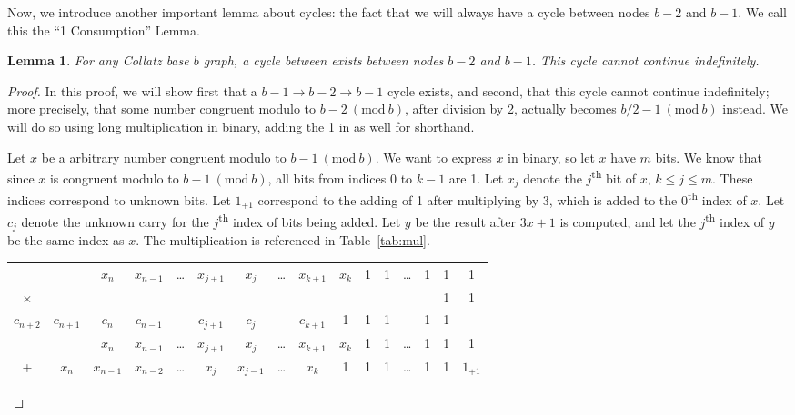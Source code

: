 \documentclass[12pt]{article}
\newcommand{\Mod}[1]{\ (\mathrm{mod}\ #1)}
\newtheorem{lemma}[theorem]{Lemma}
\theoremstyle{definition}
\begin{document}
Now, we introduce another important lemma about cycles: the fact that we will always have a cycle between nodes $b-2$ and $b-1$. We call this the ``1 Consumption'' Lemma.
\begin{lemma}
\label{lem:oneConsumption}
 For any Collatz base $b$ graph, a cycle between exists between nodes $b-2$ and $b-1$. This cycle cannot continue indefinitely.
\end{lemma}
\begin{proof}
In this proof, we will show first that a $b-1 \rightarrow b-2 \rightarrow b-1$ cycle exists, and second, that this cycle cannot continue indefinitely; more precisely, that some number congruent modulo to $b-2 \Mod{b}$, after division by 2, actually becomes $b/2-1 \Mod{b}$ instead. We will do so using long multiplication in binary, adding the 1 in as well for shorthand. \par
Let $x$ be a arbitrary number congruent modulo to $b-1 \Mod{b}$. We want to express $x$ in binary, so let $x$ have $m$ bits. We know that since $x$ is congruent modulo to $b-1 \Mod{b}$, all bits from indices 0 to $k-1$ are 1. Let $x_j$ denote the $j$\textsuperscript{th} bit of $x$, $k \leq j \leq m$. These indices correspond to unknown bits. Let $1_{+1}$ correspond to the adding of 1 after multiplying by 3, which is added to the 0\textsuperscript{th} index of $x$. Let $c_j$ denote the unknown carry for the $j$\textsuperscript{th} index of bits being added. Let $y$ be the result after $3x+1$ is computed, and let the $j$\textsuperscript{th} index of $y$ be the same index as $x$. The multiplication is referenced in Table~\ref{tab:mul}. \par
\begin{table}
\begin{tabular}{*{16}c}%
 & & $ x_{n}$  & $ x_{n-1}$  & \ldots & $ x_{j+1}$  & $ x_{j}$  & \ldots & $ x_{k+1}$  & $ x_{k}$  & 1 & 1 & \ldots & 1 & 1 & 1 \\
$\times$ & & & & & & & & & & & & & & 1 & 1 \\
\hline
\tiny ${\scriptscriptstyle c_{n+2}}$ & ${\scriptscriptstyle c_{n+1}}$ & ${\scriptscriptstyle c_{n}}$ & ${\scriptscriptstyle c_{n-1}}$ & & ${\scriptscriptstyle c_{j+1}}$ & ${\scriptscriptstyle c_{j}}$ & & ${\scriptscriptstyle c_{k+1}}$ & \tiny 1 & \tiny 1 &  \tiny 1 & &  \tiny 1 & \tiny 1 & \\
  & & $ x_{n}$  & $ x_{n-1}$  & \ldots & $ x_{j+1}$  & $ x_{j}$  & \ldots & $ x_{k+1}$  & $ x_{k}$  & 1 & 1 & \ldots & 1 & 1 & 1 \\
  + & $ x_{n}$  & $ x_{n-1}$  & $ x_{n-2}$  & \ldots & $ x_{j}$  & $ x_{j-1}$  & \ldots & $ x_{k}$  & 1 & 1 & 1 & \ldots & 1 & 1 & $1_{+1}$  \\

\end{tabular}
\end{table}
\end{proof}
\end{document}
